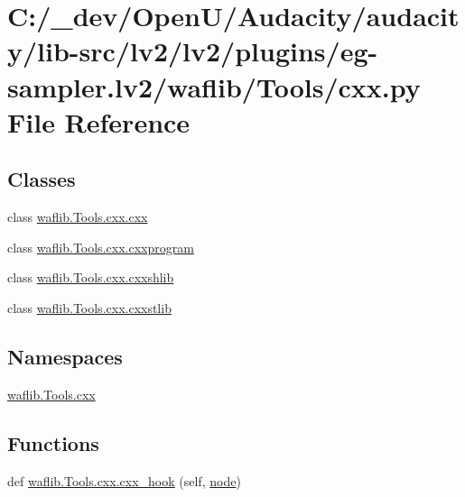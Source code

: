 \hypertarget{lv2_2plugins_2eg-sampler_8lv2_2waflib_2_tools_2cxx_8py}{}\section{C\+:/\+\_\+dev/\+Open\+U/\+Audacity/audacity/lib-\/src/lv2/lv2/plugins/eg-\/sampler.lv2/waflib/\+Tools/cxx.py File Reference}
\label{lv2_2plugins_2eg-sampler_8lv2_2waflib_2_tools_2cxx_8py}
\subsection*{Classes}
\begin{DoxyCompactItemize}
\item 
class \hyperlink{classwaflib_1_1_tools_1_1cxx_1_1cxx}{waflib.\+Tools.\+cxx.\+cxx}
\item 
class \hyperlink{classwaflib_1_1_tools_1_1cxx_1_1cxxprogram}{waflib.\+Tools.\+cxx.\+cxxprogram}
\item 
class \hyperlink{classwaflib_1_1_tools_1_1cxx_1_1cxxshlib}{waflib.\+Tools.\+cxx.\+cxxshlib}
\item 
class \hyperlink{classwaflib_1_1_tools_1_1cxx_1_1cxxstlib}{waflib.\+Tools.\+cxx.\+cxxstlib}
\end{DoxyCompactItemize}
\subsection*{Namespaces}
\begin{DoxyCompactItemize}
\item 
 \hyperlink{namespacewaflib_1_1_tools_1_1cxx}{waflib.\+Tools.\+cxx}
\end{DoxyCompactItemize}
\subsection*{Functions}
\begin{DoxyCompactItemize}
\item 
def \hyperlink{namespacewaflib_1_1_tools_1_1cxx_a31f0414cdfdb6dd749e0f65f788bfbda}{waflib.\+Tools.\+cxx.\+cxx\+\_\+hook} (self, \hyperlink{structnode}{node})
\end{DoxyCompactItemize}
